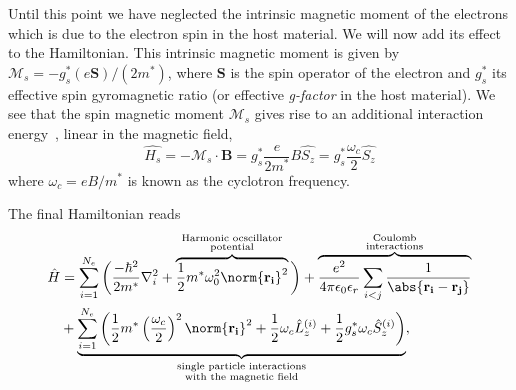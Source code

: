 Until this point we have neglected the intrinsic magnetic moment of the electrons which is due to the electron spin in the host material. We will now add its effect to the Hamiltonian. This intrinsic magnetic moment is given by $\mathcal{M}_s=-g^*_s (e \mathbf{S})/(2m^*)$, where $\mathbf{S}$ is the spin operator of the electron and $g^*_s$ its effective spin gyromagnetic ratio (or effective \textit{g-factor} in the host material).%
We see that the spin magnetic moment $\mathcal{M}_s$ gives rise to an additional interaction energy~\cite{Bransden2003}, linear in the magnetic field,
\begin{equation}
\label{eq:spinHs}
  \hat{H_s}= - \mathcal{M}_s \cdot \mathbf{B} = g^*_s \frac{e }{2 m^*} B \hat{S_z}= g^*_s \frac{\omega_c}{2} \hat{S_z}
\end{equation}
where $\omega_c=e B/m^*$ is known as the cyclotron frequency.

The final Hamiltonian reads
\begin{align}
  \hat{H}&=\sum_{i=1}^{N_e} \bigg(  \frac{- \hbar^2}{2m^*} \nabla_i^2 + \overbrace{\frac{1}{2} m^* \omega_0^2 \norm{\mathbf{r_i}}^2}^{\begin{smallmatrix}
  \text{Harmonic ocscillator} \\
  \text{potential}
\end{smallmatrix}} \bigg) + \overbrace{\frac{e^2}{4 \pi \epsilon_0 \epsilon_r} \sum_{i<j}\frac{1}{\abs{\mathbf{r_i}-\mathbf{r_j}}}}^{\begin{smallmatrix}
  \text{Coulomb} \\
  \text{interactions}
\end{smallmatrix}}  \nonumber \\
&+  \underbrace{\sum_{i=1}^{N_e} \left( \frac{1}{2} m^* \left( \frac{\omega_c}{2} \right)^2 \norm{\mathbf{r_i}}^2 + \frac{1}{2}  \omega_c \hat{L}_z^{(i)}+ \frac{1  }{2} g_s^*  \omega_c \hat{S}_z^{(i)}\right)}_{\begin{smallmatrix}
  \text{single particle interactions} \\
  \text{with the magnetic field}
\end{smallmatrix}},
\end{align}

